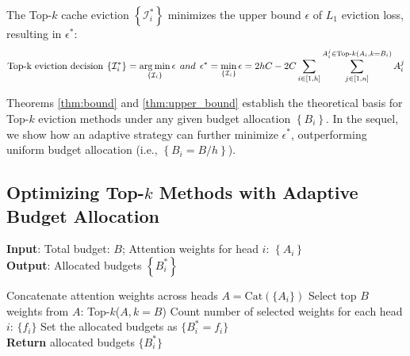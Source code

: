 \begin{theorem}
	\label{thm:upper_bound}
 The Top-$k$ cache eviction $\left\{ \mathcal{I}^*_i \right\}$ minimizes the upper bound $\epsilon$ of $L_1$ eviction loss, resulting in $\epsilon^*$:
		\begin{equation}
		\text{Top-k eviction decision} \:	\left\{ \mathcal{I}^*_i \right\} = \operatorname*{arg\,min}_{\left\{ \mathcal{I}_i \right\}} \epsilon  \:\: and \:\:
			\epsilon^*= \min_{\left\{ \mathcal{I}_i \right\}} \epsilon = 2hC - 2C\sum_{i\in [1, h]}\sum_{j \in [1, n]}^{A_i^j \in \text{Top-$k$}(A_i,k=B_i)} A_i^j
		\end{equation} 
\end{theorem}

{
Theorems \ref{thm:bound} and \ref{thm:upper_bound} establish the theoretical basis for Top-$k$ eviction methods under any given budget allocation $\left\{B_i\right\}$.
In the sequel, we show how an adaptive strategy can further minimize $\epsilon^*$, outperforming uniform budget allocation (i.e., $\left\{B_i = B/h\right\}$).
}



\subsection{Optimizing Top-$k$ Methods with Adaptive Budget Allocation}
\label{sec:optimizing}
		\begin{algorithm}[H]  
			\caption{Ada-KV: Adaptive Budget Allocation}  
			\label{alg:allocation}  
			\textbf{Input}: Total budget: $B$; Attention weights for head $i$: $\left\{A_{i}\right\}$ \\
			\textbf{Output}: Allocated budgets  $\left\{B^*_i \right\}$  
			\begin{algorithmic}[1]  
				\STATE Concatenate attention weights across heads $A=\text{Cat}\left(\{A_i\}\right)$  
				\STATE Select top $B$ weights from $A$: Top-$k$($A,k=B$)  
				\STATE Count number of selected weights for each head $i$: $\{f_i\}$  
				\STATE Set the allocated budgets as $\{B^*_i = f_i\}$ \\
				\textbf{Return} allocated budgets $\{B^*_i\}$  
			\end{algorithmic}  
		\end{algorithm}  

